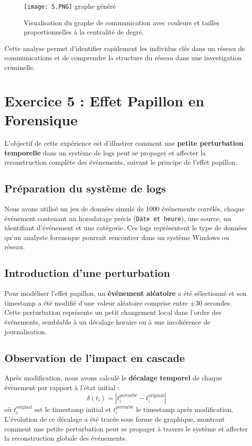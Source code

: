 \documentclass[12pt,a4paper]{report}
\begin{document}
	\begin{figure}[H]
		\centering
		\texttt{[image: 5.PNG]} graphe généré
		\caption{Visualisation du graphe de communication avec couleurs et tailles proportionnelles à la centralité de degré.}
		\label{fig:graph_example}
	\end{figure}
	
	Cette analyse permet d'identifier rapidement les individus clés dans un réseau de communications et de comprendre la structure du réseau dans une investigation criminelle.
	
	

	
	\section*{Exercice 5 : Effet Papillon en Forensique}
	

L'objectif de cette expérience est d'illustrer comment une \textbf{petite perturbation temporelle} dans un système de logs peut se propager et affecter la reconstruction complète des événements, suivant le principe de l'effet papillon.

\subsection*{Préparation du système de logs}
Nous avons utilisé un jeu de données simulé de 1000 événements corrélés, chaque événement contenant un horodatage précis (\texttt{Date et heure}), une source, un identifiant d'événement et une catégorie. Ces logs représentent le type de données qu'un analyste forensique pourrait rencontrer dans un système Windows ou réseau.

\subsection*{Introduction d'une perturbation}
Pour modéliser l'effet papillon, un \textbf{événement aléatoire} a été sélectionné et son timestamp a été modifié d'une valeur aléatoire comprise entre $\pm 30$ secondes. Cette perturbation représente un petit changement local dans l'ordre des événements, semblable à un décalage horaire ou à une incohérence de journalisation.

\subsection*{Observation de l'impact en cascade}
Après modification, nous avons calculé le \textbf{décalage temporel} de chaque événement par rapport à l'état initial :
\[
\delta(t_i) = \left| t_i^\text{perturbé} - t_i^\text{original} \right|
\]
où $t_i^\text{original}$ est le timestamp initial et $t_i^\text{perturbé}$ le timestamp après modification. L'évolution de ce décalage a été tracée sous forme de graphique, montrant comment une petite perturbation peut se propager à travers le système et affecter la reconstruction globale des événements.
\end{document}

